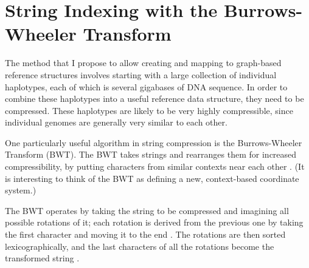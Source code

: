 \documentclass[11pt,proposal]{ucthesis}
\begin{document}

    
    
    
        
        
    

        
    

\section{String Indexing with the Burrows-Wheeler Transform}

The method that I propose to allow creating and mapping to graph-based reference structures involves starting with a large collection of individual haplotypes, each of which is several gigabases of DNA sequence. In order to combine these haplotypes into a useful reference data structure, they need to be compressed. These haplotypes are likely to be very highly compressible, since individual genomes are generally very similar to each other.

One particularly useful algorithm in string compression is the Burrows-Wheeler Transform (BWT). The BWT takes strings and rearranges them for increased compressibility, by putting characters from similar contexts near each other \cite{burrows1994block}. (It is interesting to think of the BWT as defining a new, context-based coordinate system.)

The BWT operates by taking the string to be compressed and imagining all possible rotations of it; each rotation is derived from the previous one by taking the first character and moving it to the end \cite{burrows1994block}. The rotations are then sorted lexicographically, and the last characters of all the rotations become the transformed string \cite{burrows1994block}.
\end{document}
